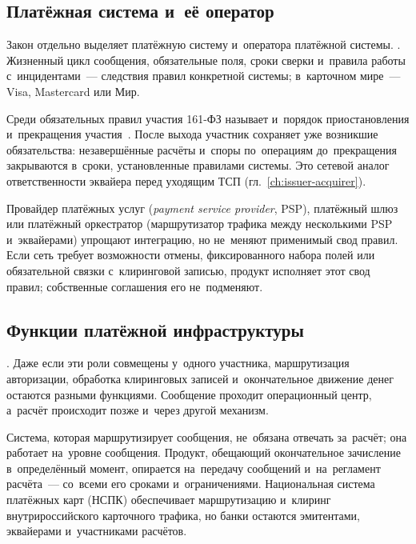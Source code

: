 \subsection*{Платёжная система и~её оператор}

Закон отдельно выделяет платёжную систему и~оператора платёжной системы.
.
Жизненный цикл сообщения, обязательные поля, сроки сверки и~правила работы
с~инцидентами~--- следствия правил конкретной системы; в~карточном мире~---
Visa, Mastercard или Мир.

Среди обязательных правил участия 161-ФЗ называет и~порядок приостановления
и~прекращения участия~\cite{fz-161}. После выхода участник сохраняет уже
возникшие обязательства: незавершённые расчёты и~споры по~операциям
до~прекращения закрываются в~сроки, установленные правилами системы. Это
сетевой аналог ответственности эквайера перед уходящим ТСП
(гл.~\ref{ch:issuer-acquirer}).

Провайдер платёжных услуг (\textit{payment service provider}, PSP), платёжный шлюз или
платёжный оркестратор (маршрутизатор трафика между несколькими PSP
и~эквайерами) упрощают интеграцию, но не~меняют применимый свод правил. Если
сеть требует возможности отмены, фиксированного набора полей или обязательной
связки с~клиринговой записью, продукт исполняет этот свод правил; собственные
соглашения его не~подменяют.

\subsection*{Функции платёжной инфраструктуры}

. Даже если эти роли совмещены у~одного участника,
маршрутизация авторизации, обработка клиринговых записей и~окончательное
движение денег остаются разными функциями. Сообщение проходит операционный
центр, а~расчёт происходит позже и~через другой механизм.

Система, которая маршрутизирует сообщения, не~обязана отвечать за~расчёт; она
работает на~уровне сообщения. Продукт, обещающий окончательное зачисление
в~определённый момент, опирается на~передачу сообщений и~на~регламент
расчёта~--- со~всеми его сроками и~ограничениями. Национальная система
платёжных карт (НСПК) обеспечивает маршрутизацию и~клиринг внутрироссийского
карточного трафика, но банки остаются эмитентами, эквайерами и~участниками
расчётов.

